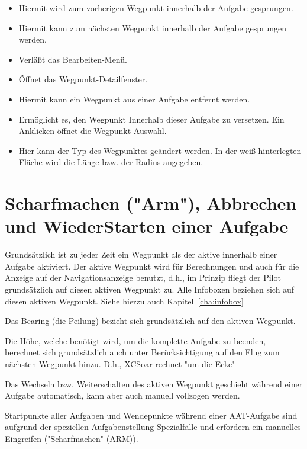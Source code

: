\begin{itemize}
\item {} Hiermit wird zum vorherigen Wegpunkt innerhalb der Aufgabe gesprungen.
\item {} Hiermit kann zum nächsten Wegpunkt innerhalb der Aufgabe gesprungen werden.
\item {} Verläßt das Bearbeiten-Menü.
\item {} Öffnet das Wegpunkt-Detailfenster.
\item {} Hiermit kann ein Wegpunkt aus einer Aufgabe entfernt werden.
\item {} Ermöglicht es, den Wegpunkt Innerhalb dieser Aufgabe zu versetzen. Ein Anklicken öffnet die Wegpunkt Auswahl.
\item {}  Hier kann der Typ des Wegpunktes geändert werden. In der weiß hinterlegten Fläche wird die Länge bzw. der Radius angegeben.
\end{itemize}

\section{Scharfmachen  ("Arm"), Abbrechen   und WiederStarten  einer Aufgabe}
\label{sec:advanc-rest-tasks}
Grundsätzlich ist zu jeder Zeit ein Wegpunkt als der aktive innerhalb einer Aufgabe aktiviert.
Der aktive Wegpunkt wird für Berechnungen und auch für die Anzeige auf der Navigationsanzeige benutzt, d.h., im Prinzip fliegt der Pilot grundsätzlich auf diesen aktiven Wegpunkt zu.
\textcolor[rgb]{0.00,0.00,0.50}{Alle Infoboxen  beziehen sich auf diesen aktiven Wegpunkt}.
Siehe hierzu auch Kapitel~\ref{cha:infobox}

Das Bearing (die Peilung) bezieht sich grundsätzlich auf den aktiven Wegpunkt.

Die Höhe, welche benötigt wird, um die komplette Aufgabe zu beenden, berechnet sich grundsätzlich auch unter Berücksichtigung auf den Flug zum nächsten Wegpunkt hinzu. D.h., \textsf{XCSoar} rechnet "um die Ecke"

Das Wechseln bzw. Weiterschalten des aktiven Wegpunkt geschieht während einer Aufgabe automatisch, kann aber auch manuell vollzogen werden.

Startpunkte aller Aufgaben und Wendepunkte während einer AAT-Aufgabe sind aufgrund der speziellen Aufgabenstellung  Spezialfälle und erfordern ein manuelles Eingreifen ("Scharfmachen" (ARM)).

